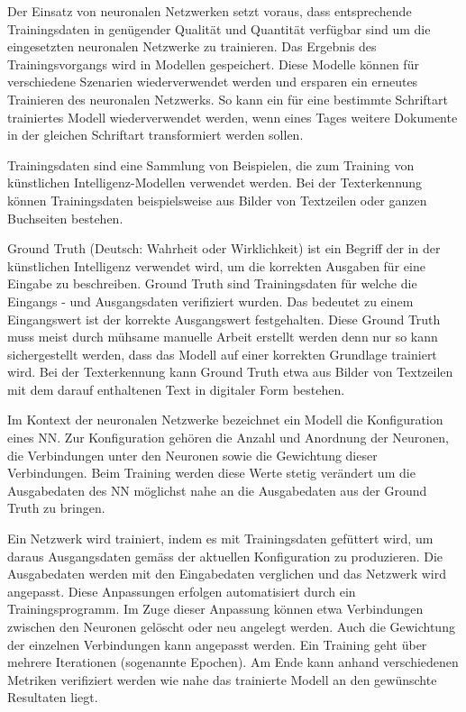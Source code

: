 \documentclass[a4paper,oneside, 12pt]{report}
\begin{document}
Der Einsatz von neuronalen Netzwerken setzt voraus, dass entsprechende Trainingsdaten in genügender Qualität und Quantität verfügbar sind um die eingesetzten neuronalen Netzwerke zu trainieren. Das Ergebnis des Trainingsvorgangs wird in Modellen gespeichert. Diese Modelle können für verschiedene Szenarien wiederverwendet werden und ersparen ein erneutes Trainieren des neuronalen Netzwerks. So kann ein für eine bestimmte Schriftart trainiertes Modell wiederverwendet werden, wenn eines Tages weitere Dokumente in der gleichen Schriftart transformiert werden sollen.

Trainingsdaten sind eine Sammlung von Beispielen, die zum Training von künstlichen Intelligenz-Modellen verwendet werden. Bei der Texterkennung können Trainingsdaten beispielsweise aus Bilder von Textzeilen oder ganzen Buchseiten bestehen.

Ground Truth (Deutsch: Wahrheit oder Wirklichkeit) ist ein Begriff der in der künstlichen Intelligenz verwendet wird, um die korrekten Ausgaben für eine Eingabe zu beschreiben. Ground Truth sind Trainingsdaten für welche die Eingangs - und Ausgangsdaten verifiziert wurden. Das bedeutet zu einem Eingangswert ist der korrekte Ausgangswert festgehalten. Diese Ground Truth muss meist durch mühsame manuelle Arbeit erstellt werden denn nur so kann sichergestellt werden, dass das Modell auf einer korrekten Grundlage trainiert wird. Bei der Texterkennung kann Ground Truth etwa aus Bilder von Textzeilen mit dem darauf enthaltenen Text in digitaler Form bestehen.

Im Kontext der neuronalen Netzwerke bezeichnet ein Modell die Konfiguration eines \ac{NN}. Zur Konfiguration gehören die Anzahl und Anordnung der Neuronen, die Verbindungen unter den Neuronen sowie die Gewichtung dieser Verbindungen. Beim Training werden diese Werte stetig verändert um die Ausgabedaten des \ac{NN} möglichst nahe an die Ausgabedaten aus der Ground Truth zu bringen.

Ein Netzwerk wird trainiert, indem es mit Trainingsdaten gefüttert wird, um daraus Ausgangsdaten gemäss der aktuellen Konfiguration zu produzieren. Die Ausgabedaten werden mit den Eingabedaten verglichen und das Netzwerk wird angepasst. Diese Anpassungen erfolgen automatisiert durch ein Trainingsprogramm. Im Zuge dieser Anpassung können etwa Verbindungen zwischen den Neuronen gelöscht oder neu angelegt werden. Auch die Gewichtung der einzelnen Verbindungen kann angepasst werden. Ein Training geht über mehrere Iterationen (sogenannte Epochen). Am Ende kann anhand verschiedenen Metriken verifiziert werden wie nahe das trainierte Modell an den gewünschte Resultaten liegt.\cite{ibmnn}
\end{document}
